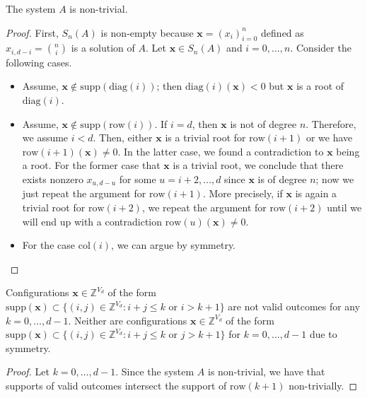 \begin{proposition}
The system $A$ is non-trivial.
\end{proposition}

\begin{proof}
First, $S_{n}(A)$ is non-empty because $\mathbf{x} = (x_{i})_{i=0}^n$ defined as $x_{i, d-i} = {n \choose i}$ is a solution of $A$. Let $\mathbf{x} \in S_{n}(A)$ and $i = 0, \dots, n$. Consider the following cases.
\begin{itemize}
    \item Assume, $\mathbf{x} \notin \mathrm{supp}(\mathrm{diag}(i))$; then $\mathrm{diag}(i)(\mathbf{x}) < 0$ but $\mathbf{x}$ is a root of \( \mathrm{diag}(i) \). 
    \item Assume, $\mathbf{x} \notin \mathrm{supp}(\mathrm{row}(i))$. If $i = d$, then $\mathbf{x}$ is not of degree $n$. Therefore, we assume $i < d$. Then, either $\mathbf{x}$ is a trivial root for $\mathrm{row}(i+1)$ or we have $\mathrm{row}(i+1)(\mathbf{x}) \neq 0$. In the latter case, we found a contradiction to $\mathbf{x}$ being a root. For the former case that $\mathbf{x}$ is a trivial root, we conclude that there exists nonzero $x_{u, d-u}$ for some $u = i+2, \dots, d$ since $\mathbf{x}$ is of degree $n$; now we just repeat the argument for $\mathrm{row}(i+1)$. More precisely, if $\mathbf{x}$ is again a trivial root for $\mathrm{row}(i+2)$, we repeat the argument for $\mathrm{row}(i+2)$ until we will end up with a contradiction $\mathrm{row}(u)(\mathbf{x}) \neq 0$.
    \item For the case $\mathrm{col}(i)$, we can argue by symmetry.
\end{itemize}
\end{proof}

\begin{corollary}
Configurations $\mathbf{x} \in \mathbb{Z}^{V_{d}}$ of the form $\mathrm{supp}(\mathbf{x}) \subset \{ (i,j) \in \mathbb{Z}^{V_{d}} : i + j \leq k \text{ or } i > k + 1 \}$ are not valid outcomes for any $k = 0, \dots, d-1$. Neither are configurations $\mathbf{x} \in \mathbb{Z}^{V_{d}}$ of the form $\mathrm{supp}(\mathbf{x}) \subset \{ (i,j) \in \mathbb{Z}^{V_{d}} : i + j \leq k \text{ or } j > k + 1 \}$ for $k = 0, \dots, d-1$ due to symmetry.
\end{corollary}

\begin{proof}
    Let $k = 0, \dots, d-1$.
Since the system $A$ is non-trivial, we have that supports of valid outcomes intersect the support of $\mathrm{row}(k+1)$ non-trivially.
\end{proof}

